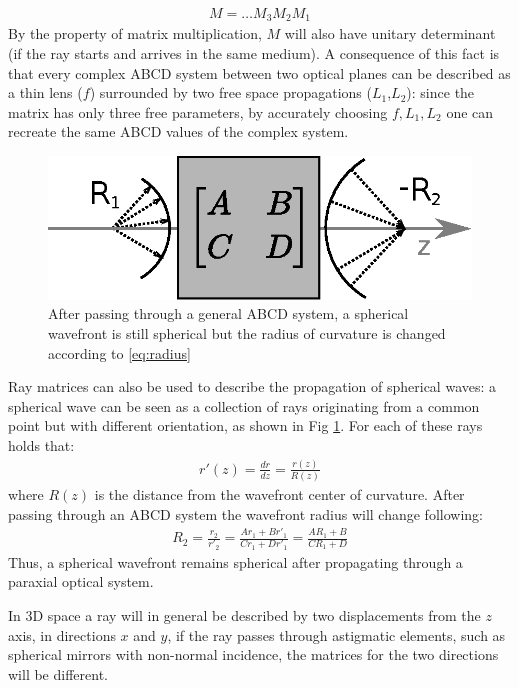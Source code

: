 \begin{align*}
M = \dots M_3 M_2 M_1
\end{align*}
By the property of matrix multiplication, $M$ will also have unitary determinant (if the ray starts and arrives in the same medium). A consequence of this fact is that every complex ABCD system between two optical planes can be described as a thin lens ($f$) surrounded by two free space propagations ($L_1$,$L_2$): since the matrix has only three free parameters, by accurately choosing $f,L_1,L_2$ one can recreate the same ABCD values of the complex system.
\begin{figure}
	\centering
	\includegraphics[width=0.9\linewidth]{images/abcdradius.eps}
	\caption{After passing through a general ABCD system, a spherical wavefront is still spherical but the radius of curvature is changed according to \ref{eq:radius}}
	\label{fig:radius}
\end{figure}

Ray matrices can also be used to describe the propagation of spherical waves: a spherical wave can be seen as a collection of rays originating from a common point but with different orientation, as shown in Fig \ref{fig:radius}. For each of these rays holds that:
\begin{align}
	r'(z) = \frac{dr}{dz} = \frac{r(z)}{R(z)}
\end{align}
where $R(z)$ is the distance from the wavefront center of curvature.
After passing through an ABCD system the wavefront radius will change following:
\begin{align}
R_2 = \frac{r_2}{r'_2} = \frac{Ar_1+Br'_1}{Cr_1+Dr'_1}= \frac{AR_1+B}{CR_1+D}
\label{eq:radius}
\end{align}
Thus, a spherical wavefront remains spherical after propagating through a paraxial optical system.

In 3D space a ray will in general be described by two displacements from the $z$ axis, in directions $x$ and $y$, if the ray passes through astigmatic elements, such as spherical mirrors with non-normal incidence, the matrices for the two directions will be different.

